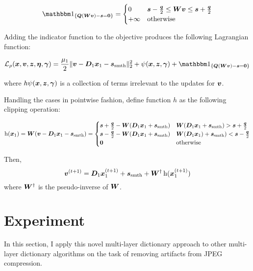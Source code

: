 \begin{equation} \label{equation:Indicator}
\indicator_{\{\mQ(\mW\vv) - \vs = \vzero\}} = \begin{cases} 0 & \vs - \frac{\vq}{2} \leq \mW\vv \leq \vs + \frac{\vq}{2} \\ + \infty & \text{otherwise} \end{cases}
\end{equation}

Adding the indicator function to the objective produces the following Lagrangian function: 

\begin{equation}
\begin{split}
\L_{\rho}(\vx,\vv,\vz,\veta,\vgamma) =  \frac{\mu_1}{2}\|\vv - \mD_1\vx_1  - \vs_{\text{smth}}\|_2^2 + \psi(\vx,\vz,\vgamma) + \indicator_{\{\mQ(\mW\vv) - \vs = \vzero\}}
\end{split}
\end{equation}

where $h\psi(\bm{x},\bm{z},\bm{\gamma})$ is a collection of terms irrelevant to the updates for $\bm{v}$.

Handling the cases in pointwise fashion, define function $h$ as the following clipping operation:


\begin{equation}
\operatorname{h}(\bm{x}_1) = \bm{W}(\bm{v} - \bm{D}_1\bm{x}_1 - \bm{s}_{\textrm{smth}}) = \begin{cases} \bm{s} + \frac{\bm{q}}{2} - \bm{W}(\bm{D}_1\bm{x}_1 + \bm{s}_{\textrm{smth}}) & \bm{W}(\bm{D}_1\bm{x}_1 + \bm{s}_{\textrm{smth}}) > \bm{s} + \frac{\bm{q}}{2} \\ \bm{s} - \frac{\bm{q}}{2} - \bm{W}(\bm{D}_1\bm{x}_1 + \bm{s}_{\textrm{smth}}) & \bm{W}(\bm{D}_1\bm{x}_1) + \bm{s}_{\textrm{smth}}) < \bm{s} - \frac{\bm{q}}{2} \\ \bm{0} & \text{otherwise}
\end{cases}
\end{equation}

Then,
\begin{equation}
\bm{v}^{(t + 1)} = \bm{D}_1\bm{x}_1^{(t + 1)} + \bm{s}_{\text{smth}} + \bm{W}^{\dagger}\operatorname{h}(\bm{x}_1^{(t + 1)})
\end{equation}
where $\bm{W}^{\dagger}$ is the pseudo-inverse of $\bm{W}$.


\section{Experiment}
In this section, I apply this novel multi-layer dictionary approach to other multi-layer dictionary algorithms on the task of removing artifacts from JPEG compression.
